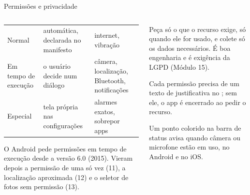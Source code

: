 \begin{frame}{Permissões e privacidade}
  \begin{columns}[T]
    \begin{column}{0.52\textwidth}
      \scriptsize
      \begin{tabularx}{\linewidth}{@{}l L L@{}}
        \toprule
         &  &  \\
        \midrule
        Normal & automática, declarada no manifesto & internet, vibração \\
        Em tempo de execução & o usuário decide num diálogo & câmera, localização, Bluetooth, notificações \\
        Especial & tela própria nas configurações & alarmes exatos, sobrepor apps \\
        \bottomrule
      \end{tabularx}
      \normalsize
      \begin{historia}
        O Android pede permissões em tempo de execução desde a versão 6.0 (2015). Vieram depois a permissão de uma só vez (11), a localização aproximada (12) e o seletor de fotos sem permissão (13).
      \end{historia}
    \end{column}
    \begin{column}{0.46\textwidth}
      \begin{definicao}
        Peça só o que o recurso exige, só quando ele for usado, e colete só os dados necessários. É boa engenharia e é exigência da LGPD (Módulo 15).
      \end{definicao}
      \begin{conceito}[No iOS]
        Cada permissão precisa de um texto de justificativa no ; sem ele, o app é encerrado ao pedir o recurso.
      \end{conceito}
      \begin{dica}
        Um ponto colorido na barra de status avisa quando câmera ou microfone estão em uso, no Android e no iOS.
      \end{dica}
    \end{column}
  \end{columns}
\end{frame}

